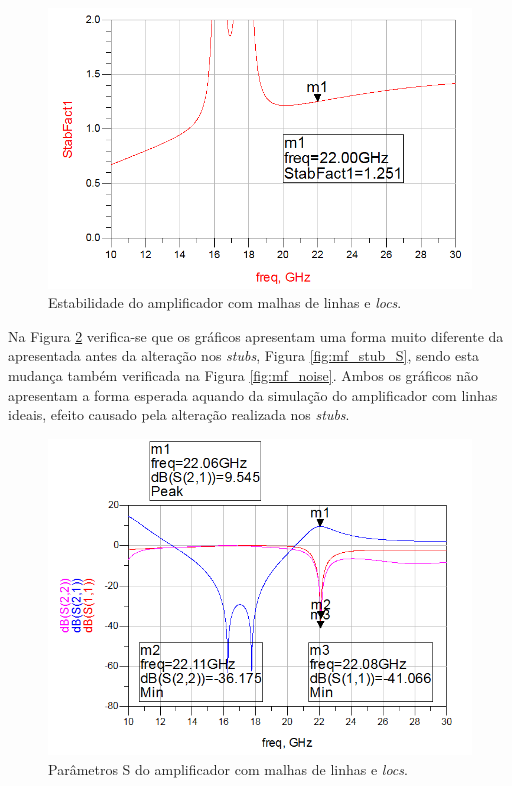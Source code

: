 \documentclass[11pt]{article}
\numberwithin{equation}{section}
\begin{document}
\begin{figure}[H]
	\centering
	\includegraphics[keepaspectratio=true, scale=0.41]{exps/mf_estab}
	\vspace{-0.5em}
	\caption{Estabilidade do amplificador com malhas de linhas e \textit{locs}.}
	\vspace{-0.8em}
	\label{fig:mf_est}
\end{figure}

Na Figura \ref{fig:mf_S} verifica-se que os gráficos apresentam uma forma muito diferente da apresentada antes da alteração nos \textit{stubs}, Figura \ref{fig:mf_stub_S}, sendo esta mudança também verificada na Figura \ref{fig:mf_noise}. Ambos os gráficos não apresentam a forma esperada aquando da simulação do amplificador com linhas ideais, efeito causado pela alteração realizada nos \textit{stubs}.

\begin{figure}[H]
	\centering
	\includegraphics[keepaspectratio=true, scale=0.45]{exps/mf_S}
	\vspace{-0.5em}
	\caption{Parâmetros S do amplificador com malhas de linhas e \textit{locs}.}
	\vspace{-0.8em}
	\label{fig:mf_S}
\end{figure}
\end{document}
